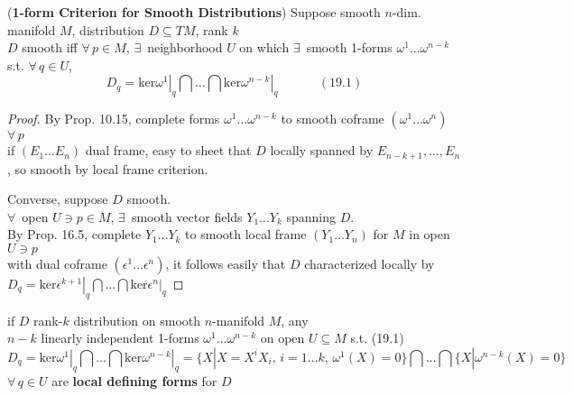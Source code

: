 \begin{lemma}[19.5] (\textbf{1-form Criterion for Smooth Distributions}) Suppose smooth $n$-dim. manifold $M$, distribution $D \subseteq TM$, rank $k$  \\ 
$D$ smooth iff $\forall \, p \in M$, $\exists \, $ neighborhood $U$ on which $\exists \, $ smooth 1-forms $\omega^1 \dots \omega^{n-k}$ s.t. $\forall \, q \in U$, 
\begin{equation}
  D_q = \text{ker} \left. \omega^1 \right|_q \bigcap \dots \bigcap \left. \text{ker} \omega^{n-k} \right|_q  \quad \quad \quad \, (19.1)
\end{equation}
\end{lemma}
 \begin{proof}
By Prop. 10.15, complete forms $\omega^1 \dots \omega^{n-k}$ to smooth coframe $(\omega^1 \dots \omega^n)$ \quad \, $\forall \, p$ \\
if $(E_1 \dots E_n)$ dual frame, easy to sheet that $D$ locally spanned by $E_{n-k+1 }, \dots , E_n$, so smooth by local frame criterion.  

Converse, suppose $D$ smooth. \\
$\forall \, $ open $U \ni p \in M$, $\exists \, $ smooth vector fields $Y_1 \dots Y_k$ spanning $D$. \\
By Prop. 16.5, complete $Y_1 \dots Y_k$ to smooth local frame $(Y_1 \dots Y_n)$ for $M$ in open $U\ni p$ \\
with dual coframe $(\epsilon^1 \dots \epsilon^n)$, it follows easily that $D$ characterized locally by $D_q = \text{ker} \left. \epsilon^{k+1} \right|_q \bigcap \dots \bigcap \text{ker} \left. \epsilon^n \right|_q$ 

\end{proof}


if $D$ rank-$k$ distribution on smooth $n$-manifold $M$, any \\
\phantom{if $D$ } $n-k$ linearly independent 1-forms $\omega^1 \dots \omega^{n-k}$ on open $U\subseteq M$ s.t. (19.1) 
\[
D_q = \left. \text{ker}\omega^1 \right|_q \bigcap \dots \bigcap \left. \text{ker}\omega^{n-k} \right|_q = \lbrace X | X=X^iX_i, \, i =1 \dots k, \, \omega^1(X) = 0\rbrace \bigcap \dots \bigcap \lbrace X | \omega^{n-k}(X) = 0\rbrace
\]
$\forall \, q \in U$ are \textbf{local defining forms} for $D$



